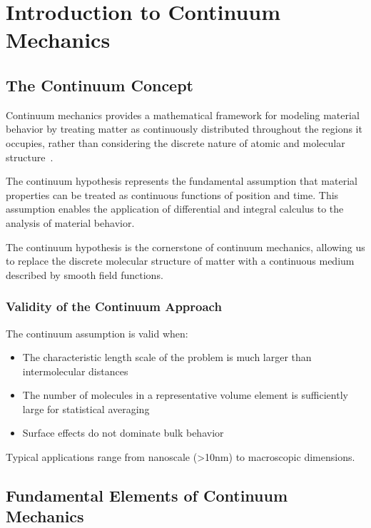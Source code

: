 \chapter{Introduction to Continuum Mechanics}

\section{The Continuum Concept}

Continuum mechanics provides a mathematical framework for modeling material behavior by treating matter as continuously distributed throughout the regions it occupies, rather than considering the discrete nature of atomic and molecular structure~\autocite{Sadd.2019}.

The continuum hypothesis represents the fundamental assumption that material properties can be treated as continuous functions of position and time. This assumption enables the application of differential and integral calculus to the analysis of material behavior.

\begin{keypoint}
The continuum hypothesis is the cornerstone of continuum mechanics, allowing us to replace the discrete molecular structure of matter with a continuous medium described by smooth field functions.
\end{keypoint}

\subsection{Validity of the Continuum Approach}

The continuum assumption is valid when:
\begin{itemize}
\item The characteristic length scale of the problem is much larger than intermolecular distances
\item The number of molecules in a representative volume element is sufficiently large for statistical averaging
\item Surface effects do not dominate bulk behavior
\end{itemize}

Typical applications range from nanoscale (>10nm) to macroscopic dimensions.

\section{Fundamental Elements of Continuum Mechanics}

